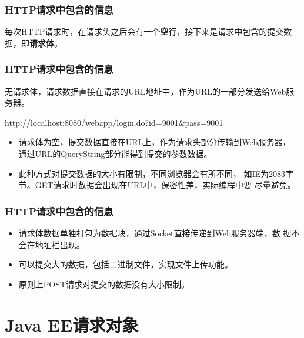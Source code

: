 \begin{frame} %
  \frametitle{HTTP请求中包含的信息} 


  每次HTTP请求时，在请求头之后会有一个{\bf\Red 空行}，接下来是请求中包含的提交数据，即{\bf\Blue 请求体}。

\end{frame}

\begin{frame} %
  \frametitle{HTTP请求中包含的信息} 


  无请求体，请求数据直接在请求的URL地址中，作为URL的一部分发送给Web服务器。
  
  \begin{xmlCode}
    http://localhost:8080/webapp/login.do?id=9001&pass=9001
  \end{xmlCode}

  \pause
  
  \begin{itemize}
  \item 请求体为空，提交数据直接在URL上，作为请求头部分传输到Web服务器，
    通过URL的QueryString部分能得到提交的参数数据。
  \item 此种方式对提交数据的大小有限制，不同浏览器会有所不同，
    如IE为2083字节。GET请求时数据会出现在URL中，保密性差，实际编程中要
    尽量避免。
  \end{itemize}

\end{frame}

\begin{frame} %
  \frametitle{HTTP请求中包含的信息} 


  \begin{itemize}
  \item 请求体数据单独打包为数据块，通过Socket直接传递到Web服务器端，数
    据不会在地址栏出现。
  \item 可以提交大的数据，包括二进制文件，实现文件上传功能。
  \item 原则上POST请求对提交的数据没有大小限制。
  \end{itemize}
\end{frame}

\section{Java EE请求对象}

